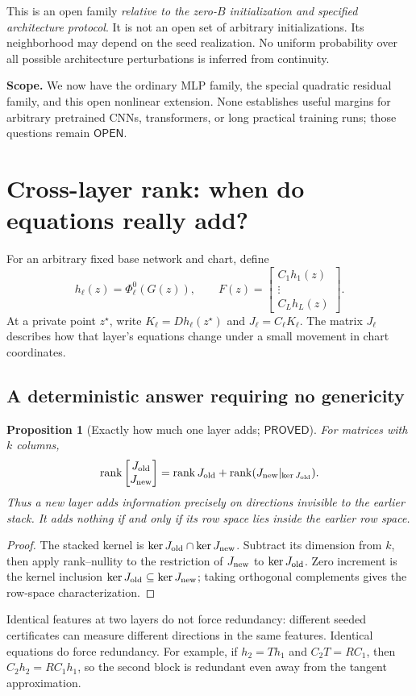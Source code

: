 \documentclass[12pt,a4paper]{article}
\theoremstyle{readable}
\newtheorem{proposition}[theorem]{Proposition}
\theoremstyle{definition}\newtheorem{example}[theorem]{Example}
\newcommand{\PP}{\mathsf{PROVED}}\newcommand{\FF}{\mathsf{FALSE}}
\newcommand{\OO}{\mathsf{OPEN}}\newcommand{\CC}{\mathsf{CONJECTURE}}
\begin{document}
This is an open family \emph{relative to the zero-\(B\) initialization and specified architecture protocol}. It is not an open set of arbitrary initializations. Its neighborhood may depend on the seed realization. No uniform probability over all possible architecture perturbations is inferred from continuity.

\textbf{Scope.} We now have the ordinary MLP family, the special quadratic residual family, and this open nonlinear extension. None establishes useful margins for arbitrary pretrained CNNs, transformers, or long practical training runs; those questions remain \(\OO\).

\section{Cross-layer rank: when do equations really add?}
\label{sec:rank}

For an arbitrary fixed base network and chart, define
\[
h_\ell(z)=\Phi_\ell^0(G(z)),\qquad
F(z)=\begin{bmatrix}C_1h_1(z)\\ \vdots\\ C_Lh_L(z)\end{bmatrix}.
\]
At a private point \(z^\star\), write
\(K_\ell=Dh_\ell(z^\star)\) and \(J_\ell=C_\ell K_\ell\).
The matrix \(J_\ell\) describes how that layer's equations change under a small movement in chart coordinates.

\subsection{A deterministic answer requiring no genericity}
\begin{proposition}[Exactly how much one layer adds; \(\PP\)]\label{prop:increment}
For matrices with \(k\) columns,
\[
\operatorname{rank}\begin{bmatrix}J_{\rm old}\\J_{\rm new}\end{bmatrix}
=\operatorname{rank} J_{\rm old}
+\operatorname{rank}(J_{\rm new}|_{\ker J_{\rm old}}).
\]
Thus a new layer adds information precisely on directions invisible to the earlier stack. It adds nothing if and only if its row space lies inside the earlier row space.
\end{proposition}
\begin{proof}
The stacked kernel is \(\ker J_{\rm old}\cap\ker J_{\rm new}\). Subtract its dimension from \(k\), then apply rank--nullity to the restriction of \(J_{\rm new}\) to \(\ker J_{\rm old}\). Zero increment is the kernel inclusion \(\ker J_{\rm old}\subseteq\ker J_{\rm new}\); taking orthogonal complements gives the row-space characterization.
\end{proof}
Identical features at two layers do not force redundancy: different seeded certificates can measure different directions in the same features. Identical equations do force redundancy. For example, if \(h_2=Th_1\) and \(C_2T=RC_1\), then \(C_2h_2=RC_1h_1\), so the second block is redundant even away from the tangent approximation.
\end{document}
